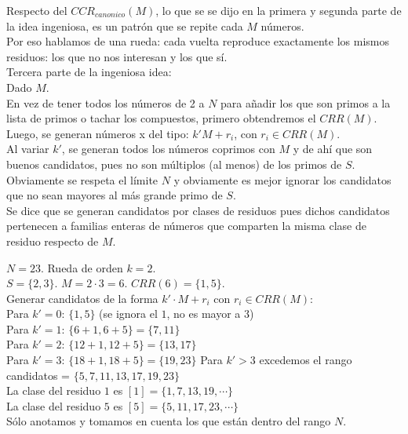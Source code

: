 Respecto del $CCR_{canonico}(M)$, lo que se se dijo en la primera y segunda parte de la idea ingeniosa, es un patrón que se repite cada $M$ números. \\
Por eso hablamos de una rueda: cada vuelta reproduce exactamente los mismos residuos: los que no nos interesan y los que sí.\\

Tercera parte de la ingeniosa idea: \\
Dado $M$. \\
En vez de tener todos los números de 2 a $N$ para añadir los que son primos a la lista de primos o tachar los compuestos, primero obtendremos el $CRR(M)$.\\
Luego, se generan números x del tipo: $k'M + r_i$, con $r_i \in CRR(M)$.  \\
Al variar $k'$, se generan todos los números coprimos con $M$ y de ahí que son buenos candidatos, pues no son múltiplos (al menos) de los primos de $S$.\\
Obviamente se respeta el límite $N$ y obviamente es mejor ignorar los candidatos que no sean mayores al más grande primo de $S$. \\
Se dice que se generan candidatos por clases de residuos pues dichos candidatos pertenecen a familias enteras de números que comparten la misma clase de residuo respecto de $M$.

\begin{ejemplo}
$N=23$. Rueda de orden $k=2$.\\
$S = \{2, 3\}$. $M = 2 \cdot 3 = 6$. $CRR(6) = \{1, 5\}$.\\
Generar candidatos de la forma $k' \cdot M + r_i$ con $r_i \in CRR(M)$: \\
Para $k'=0$: $\{1, 5\}$ (se ignora el $1$, no es mayor a $3$)\\
Para $k'=1$: $\{6+1, 6+5\} = \{7, 11\}$ \\
Para $k'=2$: $\{12+1, 12+5\} = \{13, 17\}$ \\
Para $k'=3$: $\{18+1, 18+5\} = \{19, 23\}$  Para $k' > 3$ excedemos el rango\\
candidatos = $\{5, 7, 11, 13, 17, 19, 23\}$ \\
La clase del residuo $1$ es $[1] = \{1,7,13,19, \cdots \}$ \\
La clase del residuo $5$ es $[5] = \{5,11,17,23, \cdots \}$ \\
Sólo anotamos y tomamos en cuenta los que están dentro del rango $N$.
\end{ejemplo}

